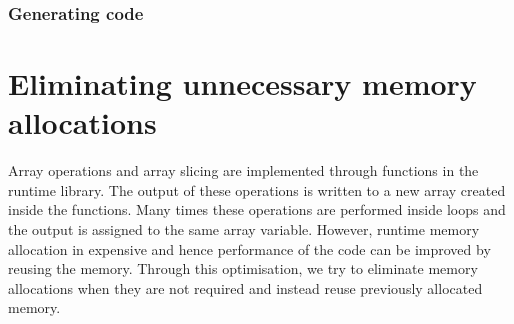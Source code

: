 \subsubsection{Generating code}
\section{Eliminating unnecessary memory allocations}
\label{sec:memoptimise}
Array operations and array slicing are implemented through functions in the runtime library. The output of these operations is written to a new array created inside the functions. Many times these operations are performed inside loops and the output is assigned to the same array variable. However, runtime memory allocation in expensive and hence performance of the code can be improved by reusing the memory. Through this optimisation, we try to eliminate memory allocations when they are not required and instead reuse previously allocated memory. 
